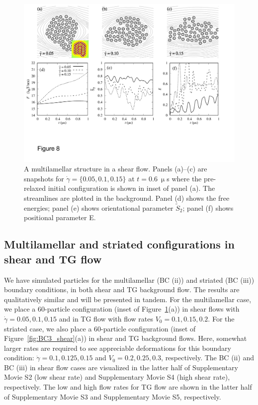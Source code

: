 \documentclass[prb,preprint,showpacs,preprintnumbers,amsmath,amssymb,longbibliography]{revtex4-1}
\begin{document}
\begin{figure}
  \begin{center}
\includegraphics[width=1.0\textwidth]{Figures/Figure8.pdf}
  \end{center}
  \vspace{-20pt}  
  \caption{\label{fig:BC2_shear} A multilamellar structure in a shear
  flow. Panels (a)--(c) are snapshots for $\dot \gamma = \{0.05, 0.1,
  0.15\}$ at $t=0.6\ \upmu$s where the pre-relaxed initial configuration
  is shown in inset of panel (a). The streamlines are plotted in the
  background. Panel (d) shows the free energies; panel (e) shows
  orientational parameter $\tilde{S}_2$; panel (f) shows positional
  parameter E.}
\end{figure}



\subsection{Multilamellar and striated configurations in shear and TG flow}
We have simulated particles for the multilamellar (BC (ii)) and striated
(BC (iii)) boundary conditions, in both shear and TG background flow.
The results are qualitatively similar and will be presented in tandem.
For the multilamellar case, we place a 60-particle configuration (inset
of Figure~\ref{fig:BC2_shear}(a)) in shear flows with $\dot\gamma=0.05,
0.1, 0.15$ and in TG flow with flow rates $V_0=0.1, 0.15, 0.2$. For the
striated case, we also place a 60-particle configuration (inset of
Figure~\ref{fig:BC3_shear}(a)) in shear and TG background flows. Here,
somewhat larger rates are required to see appreciable deformations for
this boundary condition: $\dot\gamma=0.1, 0.125, 0.15$ and $V_0=0.2,
0.25, 0.3$, respectively.
The BC (ii) and BC (iii) in shear flow cases are visualized in
the latter half of 
Supplementary Movie S2 (low shear rate) and 
Supplementary Movie S4 (high shear rate), respectively.
The low and high flow rates for TG flow are shown in
the latter half of
Supplementary Movie S3 and 
Supplementary Movie S5, respectively. 
\end{document}
